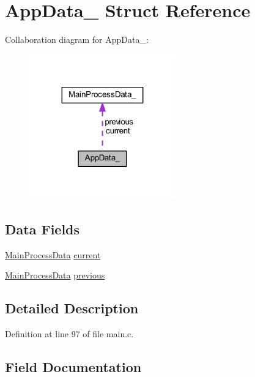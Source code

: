 \hypertarget{struct_app_data__}{}\section{App\+Data\+\_\+ Struct Reference}
\label{struct_app_data__}


Collaboration diagram for App\+Data\+\_\+\+:
\nopagebreak
\begin{figure}[H]
\begin{center}
\leavevmode
\includegraphics[width=179pt]{struct_app_data____coll__graph}
\end{center}
\end{figure}
\subsection*{Data Fields}
\begin{DoxyCompactItemize}
\item 
\mbox{\hyperlink{main_8c_a10c0332e7cd68abe97ec61fa4ac93383}{Main\+Process\+Data}} \mbox{\hyperlink{struct_app_data___aab83920d96d162d986df2bbce5d382ab}{current}}
\item 
\mbox{\hyperlink{main_8c_a10c0332e7cd68abe97ec61fa4ac93383}{Main\+Process\+Data}} \mbox{\hyperlink{struct_app_data___a57a5b5fd3e09c0d8651bffc358acd3c4}{previous}}
\end{DoxyCompactItemize}


\subsection{Detailed Description}


Definition at line 97 of file main.\+c.



\subsection{Field Documentation}
\mbox{\label{struct_app_data___aab83920d96d162d986df2bbce5d382ab}} 
